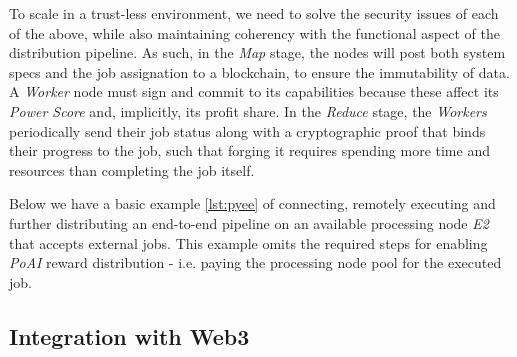 \documentclass{article}
\begin{document}
To scale in a trust-less environment, we need to solve the security issues of each of the above, while also maintaining coherency with the functional aspect of the distribution pipeline. As such, in the \textit{Map} stage, the nodes will post both system specs and the job assignation to a blockchain, to ensure the immutability of data. A \textit{Worker} node must sign and commit to its capabilities because these affect its \textit{Power Score} and, implicitly, its profit share. In the \textit{Reduce} stage, the \textit{Workers} periodically send their job status along with a cryptographic proof \cite{cryptographic proof} that binds their progress to the job, such that forging it requires spending more time and resources than completing the job itself.



Below we have a basic example \ref{lst:pyee} of connecting, remotely executing and further distributing an end-to-end pipeline on an available processing node \textit{E2} that accepts external jobs. This example omits the required steps for enabling \textit{PoAI} reward distribution - i.e. paying the processing node pool for the executed job.

\subsection{Integration with Web3}
\end{document}
